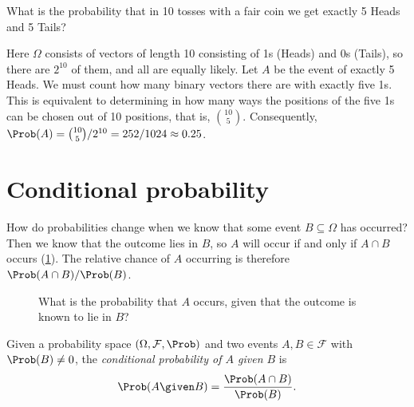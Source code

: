 \begin{example}\label{ex:five-heads}
What is the probability that in 10 tosses with a fair coin we get exactly 5 Heads and 5 Tails?
\end{example}

\begin{solution}
Here $\Omega$ consists of vectors of length 10 consisting of 1s (Heads) and 0s (Tails), so there are $2^{10}$ of them, and all are equally likely. Let $A$ be the event of exactly 5 Heads. We must count how many binary vectors there are with exactly five 1s. This is equivalent to determining in how many ways the positions of the five 1s can be chosen out of 10 positions, that is, $\binom{10}{5}$. Consequently, $\Prob(A) = \binom{10}{5}/2^{10} = 252/1024 \approx 0.25$.
\end{solution}

\section{Conditional probability}\label{sec:conditional-probability}

How do probabilities change when we know that some event $B \subseteq \Omega$ has occurred? Then we know that the outcome lies in $B$, so $A$ will occur if and only if $A \cap B$ occurs (\cref{fig:conditional-probability}). The relative chance of $A$ occurring is therefore $\Prob(A \cap B)/\Prob(B)$.

\begin{figure}[ht]
\centering
{}
\caption{What is the probability that $A$ occurs, given that the outcome is known to lie in $B$?}
\label{fig:conditional-probability}
\end{figure}

\begin{definition}\label{def:conditional-probability}
Given a probability space $(\Omega, \mathcal{F}, \Prob)$ and two events $A, B \in \mathcal{F}$ with $\Prob(B) \ne 0$, the \emph{conditional probability of $A$ given $B$} is
\begin{equation}\label{eq:conditional-probability}
  \Prob(A \given B) = \frac{\Prob(A \cap B)}{\Prob(B)}.
\end{equation}
\end{definition}


